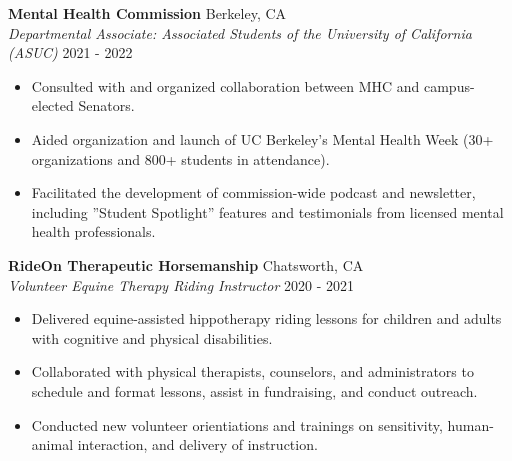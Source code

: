 \documentclass[a4paper]{article}
\begin{document}
\textbf{Mental Health Commission} \hfill Berkeley, CA\\
\textit{Departmental Associate: Associated Students of the University of California (ASUC)} \hfill 2021 - 2022\\
\vspace{-1mm}
\begin{itemize} \itemsep 1pt
\setlength\itemsep{0pt}  %
	\setlength\parskip{0pt}  %
	\setlength\parsep{0pt}  %
	\setlength\leftskip{0pt}  %
	\renewcommand\labelitemi{\tiny$\bullet$} %
	\item Consulted with and organized collaboration between MHC and campus-elected Senators.
        \item Aided organization and launch of UC Berkeley’s Mental Health Week (30+ organizations and 800+ students in attendance).
        \item Facilitated the development of commission-wide podcast and newsletter, including ”Student Spotlight” features and testimonials from licensed mental health professionals.
\end{itemize}


\textbf{RideOn Therapeutic Horsemanship} \hfill Chatsworth, CA\\
\textit{Volunteer Equine Therapy Riding Instructor} \hfill 2020 - 2021\\
\vspace{-1mm}
\begin{itemize} \itemsep 1pt
\setlength\itemsep{0pt}  %
	\setlength\parskip{0pt}  %
	\setlength\parsep{0pt}  %
	\setlength\leftskip{0pt}  %
	\renewcommand\labelitemi{\tiny$\bullet$} %
	\item Delivered equine-assisted hippotherapy riding lessons for children and adults with cognitive and physical disabilities.
        \item Collaborated with physical therapists, counselors, and administrators to schedule and format lessons, assist in fundraising, and conduct outreach.
        \item Conducted new volunteer orientiations and trainings on sensitivity, human-animal interaction, and delivery of instruction.
\end{itemize}
\end{document}
